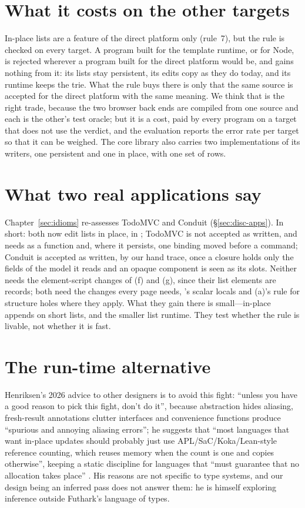 \section{What it costs on the other targets}
\label{sec:disc-targets}

In-place lists are a feature of the direct platform only (rule~7), but the rule is checked on every
target. A program built for the template runtime, or for Node, is rejected wherever a program built for
the direct platform would be, and gains nothing from it: its lists stay persistent, its edits copy as
they do today, and its runtime keeps the trie. What the rule buys there is only that the same source is
accepted for the direct platform with the same meaning. We think that is the right trade, because the two
browser back ends are compiled from one source and each is the other's test oracle; but it is a cost, paid
by every program on a target that does not use the verdict, and the evaluation reports the error rate per
target so that it can be weighed. The core library also carries two implementations of its writers, one
persistent and one in place, with one set of rows.

\section{What two real applications say}

Chapter~\ref{sec:idioms} re-assesses TodoMVC and Conduit (\S\ref{sec:disc-apps}). In short: both now edit
lists in place, in ; TodoMVC is not accepted as written, and needs  as a function
and, where it persists, one binding moved before a command; Conduit is accepted as written, by our hand
trace, once a closure holds only the fields of the model it reads and an opaque component is seen as its
slots. Neither needs the element-script changes of (f) and (g), since their list elements are
records; both need the changes every page needs, 's scalar locals and (a)'s rule for structure
holes where they apply. What they gain there is small---in-place appends on short
lists, and the smaller list runtime. They test whether the rule is livable, not whether it is fast.

\section{The run-time alternative}
\label{sec:disc-runtime}

Henriksen's 2026 advice to other designers is to avoid this fight: ``unless you have a good reason to
pick this fight, don't do it'', because abstraction hides aliasing, fresh-result annotations clutter
interfaces and convenience functions produce ``spurious and annoying aliasing errors''; he suggests that
``most languages that want in-place updates should probably just use APL/SaC/Koka/Lean-style reference
counting, which reuses memory when the count is one and copies otherwise'', keeping a static discipline
for languages that ``must guarantee that no allocation takes place'' \citep{henriksen2026aliasing}. His
reasons are not specific to type systems, and our design being an inferred pass does not answer them:
he is himself exploring inference outside Futhark's language of types.


